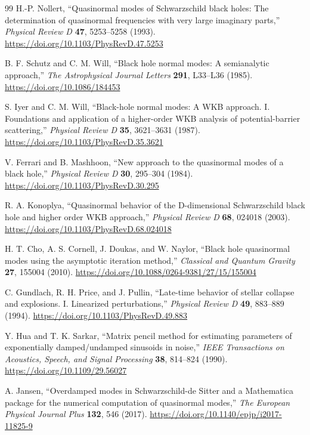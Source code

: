 \documentclass[12pt,a4paper]{article}
\begin{document}
\begin{thebibliography}{99}
H.-P. Nollert,
``Quasinormal modes of Schwarzschild black holes: The determination of
quasinormal frequencies with very large imaginary parts,''
\emph{Physical Review D} \textbf{47}, 5253--5258 (1993).
\url{https://doi.org/10.1103/PhysRevD.47.5253}

B. F. Schutz and C. M. Will,
``Black hole normal modes: A semianalytic approach,''
\emph{The Astrophysical Journal Letters} \textbf{291}, L33--L36 (1985).
\url{https://doi.org/10.1086/184453}

S. Iyer and C. M. Will,
``Black-hole normal modes: A WKB approach. I. Foundations and application of
a higher-order WKB analysis of potential-barrier scattering,''
\emph{Physical Review D} \textbf{35}, 3621--3631 (1987).
\url{https://doi.org/10.1103/PhysRevD.35.3621}

V. Ferrari and B. Mashhoon,
``New approach to the quasinormal modes of a black hole,''
\emph{Physical Review D} \textbf{30}, 295--304 (1984).
\url{https://doi.org/10.1103/PhysRevD.30.295}

R. A. Konoplya,
``Quasinormal behavior of the D-dimensional Schwarzschild black hole and higher order WKB approach,''
\emph{Physical Review D} \textbf{68}, 024018 (2003).
\url{https://doi.org/10.1103/PhysRevD.68.024018}

H. T. Cho, A. S. Cornell, J. Doukas, and W. Naylor,
``Black hole quasinormal modes using the asymptotic iteration method,''
\emph{Classical and Quantum Gravity} \textbf{27}, 155004 (2010).
\url{https://doi.org/10.1088/0264-9381/27/15/155004}

C. Gundlach, R. H. Price, and J. Pullin,
``Late-time behavior of stellar collapse and explosions. I. Linearized
perturbations,''
\emph{Physical Review D} \textbf{49}, 883--889 (1994).
\url{https://doi.org/10.1103/PhysRevD.49.883}

Y. Hua and T. K. Sarkar,
``Matrix pencil method for estimating parameters of exponentially
damped/undamped sinusoids in noise,''
\emph{IEEE Transactions on Acoustics, Speech, and Signal Processing}
\textbf{38}, 814--824 (1990).
\url{https://doi.org/10.1109/29.56027}

A. Jansen,
``Overdamped modes in Schwarzschild-de Sitter and a Mathematica package for the numerical computation of quasinormal modes,''
\emph{The European Physical Journal Plus} \textbf{132}, 546 (2017).
\url{https://doi.org/10.1140/epjp/i2017-11825-9}


\end{thebibliography}
\end{document}
